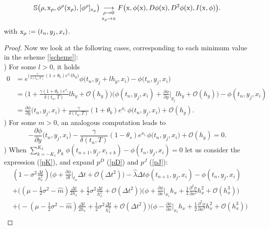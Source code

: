 $$\mathbb{S} \bigl( \rho, \mathrm{x}_{\rho}, \phi^{\rho}(\mathrm{x}_{\rho}), [\phi^{\rho}]_{\mathrm{x}_{\rho}} \bigr) \underset{\mathrm{x}_{\rho}\to \mathrm{x}}{\underset{\rho \to 0}{\longrightarrow}} 
F\bigl(\mathrm{x}, \phi(\mathrm{x}), D\phi(\mathrm{x}), D^2\phi(\mathrm{x}), I(\mathrm{x},\phi) \bigr).$$
with $\mathrm{x}_{\rho} := (t_n,y_j,x_i)$.
\begin{proof}
 Now we look at the following cases, corresponding to each minimum value in the scheme [\ref{scheme}]: \\
) For some $l>0$, it holds
  \begin{align*}
   0 &= e^{\bigl(\frac{\gamma}{\delta(t_n,T)} (1+\theta_b) e^{x_i} lh_y \bigr)}  \phi \bigl( t_n,y_j + lh_y,x_i\bigr) - \phi \bigl(t_n,y_j,x_i\bigr) \\
     &= \biggl( 1 + \frac{\gamma (1+\theta_b) e^{x_i}}{\delta(t_n,T)} lh_y + \mathcal{O}(h_y) \biggr) 
     \biggl( \phi(t_n,y_j,x_i) + \frac{\partial \phi}{\partial y}\bigg|_{y_j} l h_y + \mathcal{O}(h_y) \biggr) 
          - \phi(t_n,y_j,x_i) \\
     &= \frac{\partial \phi}{\partial y}\bigl(t_n,y_j,x_i\bigr)  + \frac{\gamma}{\delta(t_n,T)} (1+\theta_b) e^{x_i} \, \phi \bigl(t_n,y_j,x_i\bigr) + \mathcal{O}(h_y).     
  \end{align*}
  ) For some $m>0$, an analogous computation leads to  
  $$ - \frac{\partial \phi}{\partial y}\bigl(t_n,y_j,x_i\bigr)  - \frac{\gamma}{\delta(t_n,T)} (1-\theta_s) e^{x_i} \, \phi \bigl(t_n,y_j,x_i\bigr) + \mathcal{O}(h_y) = 0. $$
  ) When $\sum_{k = -K_1}^{K_2} p_k \; \phi(t_{n+1},y_j,x_{i+k}) - \phi(t_n,y_j,x_i) = 0$ let us consider the expression (\ref{pK}), and expand $p^D$ (\ref{pD}) and
  $p^J$ (\ref{pJ}):
  \begin{align*}
   & (1-\sigma^2\frac{\Delta t}{h_x^2}) \biggl( \phi + \frac{\partial \phi}{\partial t}\bigg|_{t_n} \Delta t + \mathcal{O}(\Delta t^2) \biggr)  
   -\hat \lambda \Delta t \phi(t_{n+1},y_j,x_i) - \phi(t_n,y_j,x_i) \\
   &+ \biggl( (\mu -\frac{1}{2}\sigma^2 -\hat m) \frac{\Delta t}{2h_x} + \frac{1}{2}\sigma^2\frac{\Delta t}{h_x^2} + \mathcal{O}(\Delta t^2) \biggr) 
   \bigl( \phi + \frac{\partial \phi}{\partial x}\bigg|_{x_i} h_x + \frac{1}{2} \frac{\partial^2 \phi}{\partial x^2} h_x^2 +\mathcal{O}(h_x^3) \biggr) \\
   &+ \biggl( -(\mu -\frac{1}{2}\sigma^2 -\hat m) \frac{\Delta t}{2h_x} + \frac{1}{2}\sigma^2\frac{\Delta t}{h_x^2} + \mathcal{O}(\Delta t^2) \biggr) 
   \bigl( \phi - \frac{\partial \phi}{\partial x}\bigg|_{x_i} h_x + \frac{1}{2} \frac{\partial^2 \phi}{\partial x^2} h_x^2 +\mathcal{O}(h_x^3) \biggr) \\

\end{align*}
\end{proof}
